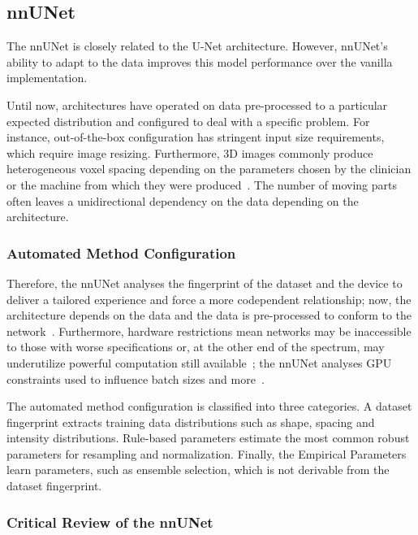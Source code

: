 \documentclass[11pt,twoside]{report}
\begin{document}
\subsection{nnUNet}\label{sect:nnunet}

The nnUNet is closely related to the U-Net architecture. However, nnUNet's ability to adapt to the data improves this model performance over the vanilla implementation.

Until now, architectures have operated on data pre-processed to a particular expected distribution and configured to deal with a specific problem. For instance, out-of-the-box configuration has stringent input size requirements, which require image resizing. Furthermore, 3D images commonly produce heterogeneous voxel spacing depending on the parameters chosen by the clinician or the machine from which they were produced~\cite{nnunet}. The number of moving parts often leaves a unidirectional dependency on the data depending on the architecture. 

\subsubsection{Automated Method Configuration}\label{sect:nnunet-automated-method-configuration}

Therefore, the nnUNet analyses the fingerprint of the dataset and the device to deliver a tailored experience and force a more codependent relationship; now, the architecture depends on the data and the data is pre-processed to conform to the network~\cite{nnunet}. Furthermore, hardware restrictions mean networks may be inaccessible to those with worse specifications or, at the other end of the spectrum, may underutilize powerful computation still available~\cite{nnunet}; the nnUNet analyses GPU constraints used to influence batch sizes and more~\cite{nnunet-git-paper}.

The automated method configuration is classified into three categories. A dataset fingerprint extracts training data distributions such as shape, spacing and intensity distributions. Rule-based parameters estimate the most common robust parameters for resampling and normalization. Finally, the Empirical Parameters learn parameters, such as ensemble selection, which is not derivable from the dataset fingerprint.

\subsubsection{Critical Review of the nnUNet}
\end{document}
